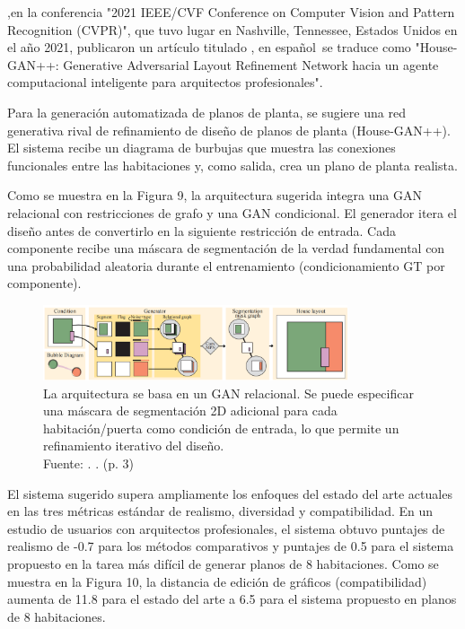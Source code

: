 \newpage
\cite{pr_nauata2021housegan} ,en la conferencia "2021 IEEE/CVF Conference on Computer Vision and Pattern Recognition (CVPR)", que tuvo lugar en Nashville, Tennessee, Estados Unidos en el año 2021, publicaron un artículo titulado , en español se traduce como "House-GAN++: Generative Adversarial Layout Refinement Network hacia un agente computacional inteligente para arquitectos profesionales".

Para la generación automatizada de planos de planta, se sugiere una red generativa rival de refinamiento de diseño de planos de planta (House-GAN++). El sistema recibe un diagrama de burbujas que muestra las conexiones funcionales entre las habitaciones y, como salida, crea un plano de planta realista.

Como se muestra en la Figura 9, la arquitectura sugerida integra una GAN relacional con restricciones de grafo y una GAN condicional. El generador itera el diseño antes de convertirlo en la siguiente restricción de entrada. Cada componente recibe una máscara de segmentación de la verdad fundamental con una probabilidad aleatoria durante el entrenamiento (condicionamiento GT por componente).

\begin{figure}[!ht]
	\begin{center}
		\includegraphics[width=0.8\textwidth]{2/figures/nauata2021.png}
		\caption[La arquitectura se basa en un GAN relacional. Se puede especificar una máscara de segmentación 2D adicional para cada habitación/puerta como condición de entrada, lo que permite un refinamiento iterativo del diseño.]{La arquitectura se basa en un GAN relacional. Se puede especificar una máscara de segmentación 2D adicional para cada habitación/puerta como condición de entrada, lo que permite un refinamiento iterativo del diseño.\\
		Fuente: \cite{pr_nauata2021housegan}. . (p. 3)}
		\label{2:fig117}
	\end{center}
\end{figure}

El sistema sugerido supera ampliamente los enfoques del estado del arte actuales en las tres métricas estándar de realismo, diversidad y compatibilidad. En un estudio de usuarios con arquitectos profesionales, el sistema obtuvo puntajes de realismo de -0.7 para los métodos comparativos y puntajes de 0.5 para el sistema propuesto en la tarea más difícil de generar planos de 8 habitaciones. Como se muestra en la Figura 10, la distancia de edición de gráficos (compatibilidad) aumenta de 11.8 para el estado del arte a 6.5 para el sistema propuesto en planos de 8 habitaciones.

